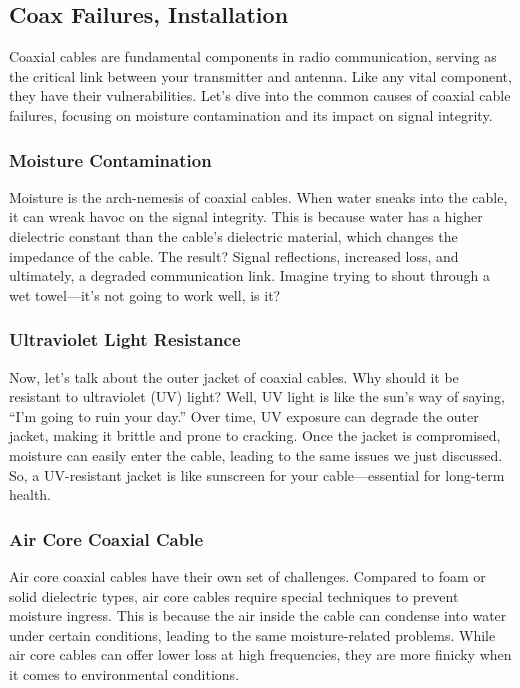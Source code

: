 \subsection{Coax Failures, Installation}
\label{subsec:coax-fail}

Coaxial cables are fundamental components in radio communication, serving as the critical link between your transmitter and antenna. Like any vital component, they have their vulnerabilities. Let's dive into the common causes of coaxial cable failures, focusing on moisture contamination and its impact on signal integrity.

\subsubsection*{Moisture Contamination}
Moisture is the arch-nemesis of coaxial cables. When water sneaks into the cable, it can wreak havoc on the signal integrity. This is because water has a higher dielectric constant than the cable's dielectric material, which changes the impedance of the cable. The result? Signal reflections, increased loss, and ultimately, a degraded communication link. Imagine trying to shout through a wet towel—it’s not going to work well, is it?

\subsubsection*{Ultraviolet Light Resistance}
Now, let’s talk about the outer jacket of coaxial cables. Why should it be resistant to ultraviolet (UV) light? Well, UV light is like the sun’s way of saying, “I’m going to ruin your day.” Over time, UV exposure can degrade the outer jacket, making it brittle and prone to cracking. Once the jacket is compromised, moisture can easily enter the cable, leading to the same issues we just discussed. So, a UV-resistant jacket is like sunscreen for your cable—essential for long-term health.

\subsubsection*{Air Core Coaxial Cable}
Air core coaxial cables have their own set of challenges. Compared to foam or solid dielectric types, air core cables require special techniques to prevent moisture ingress. This is because the air inside the cable can condense into water under certain conditions, leading to the same moisture-related problems. While air core cables can offer lower loss at high frequencies, they are more finicky when it comes to environmental conditions.

